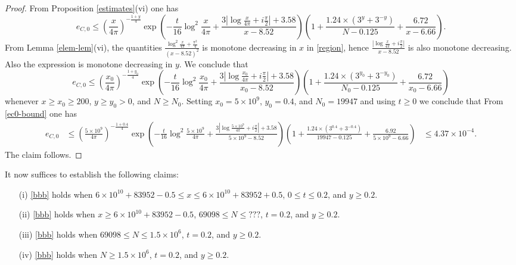 \begin{proof}
From Proposition \ref{estimates}(vi) one has
$$ e_{C,0} \leq \left(\frac{x}{4\pi}\right)^{-\frac{1+y}{4}} \exp\left( - \frac{t}{16} \log^2 \frac{x}{4\pi} + \frac{3 |\log \frac{x}{4\pi} + i \frac{\pi}{2}|+3.58}{x-8.52} \right) \left(1 + \frac{1.24 \times (3^y+3^{-y})}{N-0.125} + \frac{6.72}{x-6.66}\right).$$
From Lemma \ref{elem-lem}(vi), the quantities $\frac{\log^2 \frac{x}{4\pi} + \frac{\pi^2}{4}}{(x-8.52)^2}$ is monotone decreasing in $x$ in \eqref{region}, hence $\frac{|\log \frac{x}{4\pi} + i \frac{\pi}{2}|}{x-8.52}$ is also monotone decreasing.  Also the expression is monotone decreasing in $y$. We conclude that
\begin{equation}\label{ec0-bound}
 e_{C,0} \leq \left(\frac{x_0}{4\pi}\right)^{-\frac{1+y_0}{4}} \exp\left( - \frac{t}{16} \log^2 \frac{x_0}{4\pi} + \frac{3 |\log \frac{x_0}{4\pi} + i \frac{\pi}{2}|+3.58}{x_0-8.52} \right) \left(1 + \frac{1.24 \times (3^{y_0}+3^{-y_0})}{N_0-0.125} + \frac{6.72}{x_0-6.66}\right)
\end{equation}
whenever $x \geq x_0 \geq 200$, $y \geq y_0 > 0$, and $N \geq N_0$.  Setting $x_0 = 5 \times 10^9$, $y_0 = 0.4$, and $N_0 = 19947$ and using $t \geq 0$ we conclude that
From \eqref{ec0-bound} one has
\begin{align*}
e_{C,0} &\leq \left(\frac{5 \times 10^9}{4\pi}\right)^{-\frac{1+0.4}{4}} \exp\left( - \frac{t}{16} \log^2 \frac{5 \times 10^9}{4\pi} + \frac{3 |\log \frac{5 \times 10^9}{4\pi} + i \frac{\pi}{2}|+3.58}{5 \times 10^9-8.52} \right) \left(1 + \frac{1.24 \times (3^{0.4}+3^{-0.4})}{19947-0.125} + \frac{6.92}{5 \times 10^9-6.66}\right)
&\leq 4.37 \times 10^{-4}.
\end{align*}
The claim follows.
\end{proof}


It now suffices to establish the following claims:

\begin{itemize}
\item[(i)]  \eqref{bbb} holds when $6 \times 10^{10} + 83952 - 0.5 \leq x \leq 6 \times 10^{10} + 83952 + 0.5$, $0 \leq t \leq 0.2$, and $y \geq 0.2$.
\item[(ii)]  \eqref{bbb} holds when $x \geq 6 \times 10^{10} + 83952 - 0.5$, $69098 \leq N \leq ???$, $t = 0.2$, and $y \geq 0.2$.
\item[(iii)]  \eqref{bbb} holds when $69098 \leq N \leq 1.5 \times 10^6$, $t = 0.2$, and $y \geq 0.2$.
\item[(iv)]  \eqref{bbb} holds when $N \geq 1.5 \times 10^6$, $t = 0.2$, and $y \geq 0.2$.
\end{itemize}


